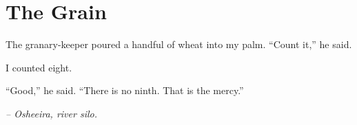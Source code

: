 \chapter*{The Grain}

The granary-keeper poured a handful of wheat into my palm. ``Count it,'' he said.

I counted eight.

``Good,'' he said. ``There is no ninth. That is the mercy.''

\smallskip

\noindent \textit{-- Osheeira, river silo.}

